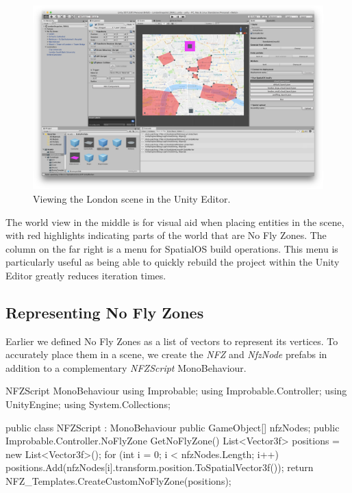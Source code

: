 \documentclass[a4paper,11pt,titlepage]{report}
\begin{document}
\begin{figure}[!hbpt]
  \center
  \includegraphics[width=\linewidth]{img/unity_londonsnapshotsmallexample.png}
  \caption{Viewing the London scene in the Unity Editor.}
  \label{fig:unity_londonsnapshotsmallexample}
\end{figure}

The world view in the middle is for visual aid when placing entities in the scene, with red highlights indicating parts of the world that are No Fly Zones. The column on the far right is a menu for SpatialOS build operations. This menu is particularly useful as being able to quickly rebuild the project within the Unity Editor greatly reduces iteration times.

\subsection{Representing No Fly Zones}
Earlier we defined No Fly Zones as a list of vectors to represent its vertices. To accurately place them in a scene, we create the \textit{NFZ} and \textit{NfzNode} prefabs in addition to a complementary \textit{NFZScript} MonoBehaviour.\\

\begin{sexylisting}[colback=white]{NFZScript MonoBehaviour}
using Improbable;
using Improbable.Controller;
using UnityEngine;
using System.Collections;

public class NFZScript : MonoBehaviour
{
  public GameObject[] nfzNodes;
  public Improbable.Controller.NoFlyZone GetNoFlyZone()
  {
    List<Vector3f> positions = new List<Vector3f>();
    for (int i = 0; i < nfzNodes.Length; i++)
    {
      positions.Add(nfzNodes[i].transform.position.ToSpatialVector3f());
    }
    return NFZ_Templates.CreateCustomNoFlyZone(positions);
  }
}
\end{sexylisting}
\end{document}
